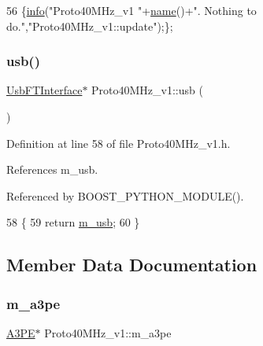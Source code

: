 \begin{DoxyCode}
56 \{\hyperlink{classObject_a644fd329ea4cb85f54fa6846484b84a8}{info}(\textcolor{stringliteral}{"Proto40MHz\_v1 "}+\hyperlink{classObject_a300f4c05dd468c7bb8b3c968868443c1}{name}()+\textcolor{stringliteral}{". Nothing to do."},\textcolor{stringliteral}{"Proto40MHz\_v1::update"});\};
\end{DoxyCode}
\mbox{\label{classProto40MHz__v1_aee48500fba238c4caf8502db32ebb991}} 
\subsubsection{\texorpdfstring{usb()}{usb()}}
{\footnotesize\ttfamily \hyperlink{classUsbFTInterface}{Usb\+F\+T\+Interface}$\ast$ Proto40\+M\+Hz\+\_\+v1\+::usb (\begin{DoxyParamCaption}{ }\end{DoxyParamCaption})\hspace{0.3cm}{\ttfamily [inline]}}



Definition at line 58 of file Proto40\+M\+Hz\+\_\+v1.\+h.



References m\+\_\+usb.



Referenced by B\+O\+O\+S\+T\+\_\+\+P\+Y\+T\+H\+O\+N\+\_\+\+M\+O\+D\+U\+L\+E().


\begin{DoxyCode}
58                        \{
59     \textcolor{keywordflow}{return} \hyperlink{classProto40MHz__v1_a954047995f615e6c6b60d178263cc09c}{m\_usb};
60   \}
\end{DoxyCode}


\subsection{Member Data Documentation}
\mbox{\label{classProto40MHz__v1_a504389d91640776389db46797ca53909}} 
\subsubsection{\texorpdfstring{m\+\_\+a3pe}{m\_a3pe}}
{\footnotesize\ttfamily \hyperlink{classA3PE}{A3\+PE}$\ast$ Proto40\+M\+Hz\+\_\+v1\+::m\+\_\+a3pe\hspace{0.3cm}{\ttfamily [private]}}



